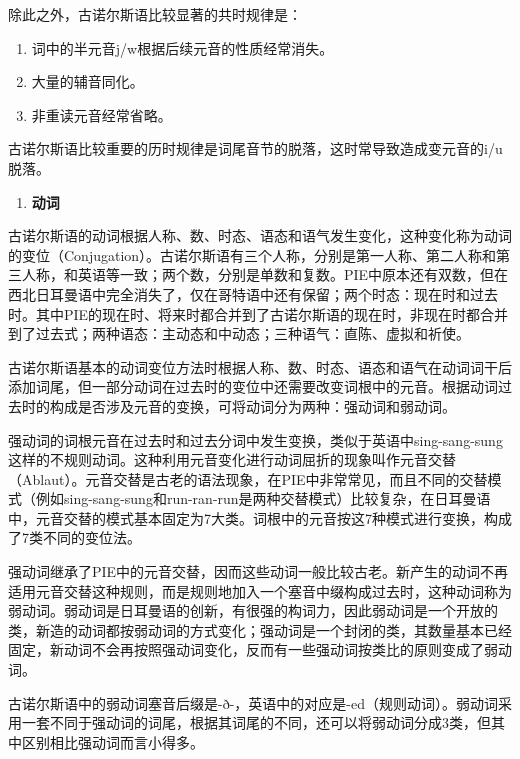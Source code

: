 除此之外，古诺尔斯语比较显著的共时规律是：

\begin{enumerate}
  \def\labelenumi{\arabic{enumi}.}
  \item
        词中的半元音j/w根据后续元音的性质经常消失。
  \item
        大量的辅音同化。
  \item
        非重读元音经常省略。
\end{enumerate}

古诺尔斯语比较重要的历时规律是词尾音节的脱落，这时常导致造成变元音的i/u脱落。

\begin{enumerate}
  \def\labelenumi{\Alph{enumi}.}
  \setcounter{enumi}{1}
  \item
        \textbf{动词}
\end{enumerate}

古诺尔斯语的动词根据人称、数、时态、语态和语气发生变化，这种变化称为动词的变位（Conjugation）。古诺尔斯语有三个人称，分别是第一人称、第二人称和第三人称，和英语等一致；两个数，分别是单数和复数。PIE中原本还有双数，但在西北日耳曼语中完全消失了，仅在哥特语中还有保留；两个时态：现在时和过去时。其中PIE的现在时、将来时都合并到了古诺尔斯语的现在时，非现在时都合并到了过去式；两种语态：主动态和中动态；三种语气：直陈、虚拟和祈使。

古诺尔斯语基本的动词变位方法时根据人称、数、时态、语态和语气在动词词干后添加词尾，但一部分动词在过去时的变位中还需要改变词根中的元音。根据动词过去时的构成是否涉及元音的变换，可将动词分为两种：强动词和弱动词。

强动词的词根元音在过去时和过去分词中发生变换，类似于英语中sing-sang-sung这样的不规则动词。这种利用元音变化进行动词屈折的现象叫作元音交替（Ablaut）。元音交替是古老的语法现象，在PIE中非常常见，而且不同的交替模式（例如sing-sang-sung和run-ran-run是两种交替模式）比较复杂，在日耳曼语中，元音交替的模式基本固定为7大类。词根中的元音按这7种模式进行变换，构成了7类不同的变位法。

强动词继承了PIE中的元音交替，因而这些动词一般比较古老。新产生的动词不再适用元音交替这种规则，而是规则地加入一个塞音中缀构成过去时，这种动词称为弱动词。弱动词是日耳曼语的创新，有很强的构词力，因此弱动词是一个开放的类，新造的动词都按弱动词的方式变化；强动词是一个封闭的类，其数量基本已经固定，新动词不会再按照强动词变化，反而有一些强动词按类比的原则变成了弱动词。

古诺尔斯语中的弱动词塞音后缀是-ð-，英语中的对应是-ed（规则动词）。弱动词采用一套不同于强动词的词尾，根据其词尾的不同，还可以将弱动词分成3类，但其中区别相比强动词而言小得多。

